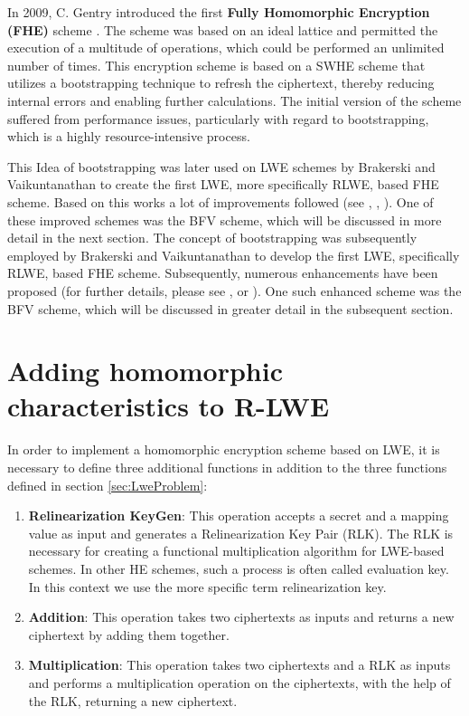 In 2009, C. Gentry introduced the first  \textbf{Fully Homomorphic Encryption (FHE)} scheme \cite{Gentry2009AFH}. The scheme was based on an ideal lattice and permitted the execution of a multitude of operations, which could be performed an unlimited number of times. This encryption scheme is based on a SWHE scheme that utilizes a bootstrapping technique to refresh the ciphertext, thereby reducing internal errors and enabling further calculations. The initial version of the scheme suffered from performance issues, particularly with regard to bootstrapping, which is a highly resource-intensive process.

This Idea of bootstrapping was later used on LWE schemes by Brakerski and Vaikuntanathan \cite{FirstLweFHE} to create the first LWE, more specifically RLWE, based FHE scheme. Based on this works a lot of improvements followed (see \cite{SurveyOfHomomorphicEncryption}, \cite{FheImplementations}, \cite{FHESurvey}). One of these improved schemes was the BFV \cite{bfv} scheme, which will be discussed in more detail in the next section. The concept of bootstrapping was subsequently employed by Brakerski and Vaikuntanathan \cite{FirstLweFHE} to develop the first LWE, specifically RLWE, based FHE scheme. Subsequently, numerous enhancements have been proposed (for further details, please see \cite{SurveyOfHomomorphicEncryption}, \cite{FheImplementations} or \cite{FHESurvey}). One such enhanced scheme was the BFV scheme, which will be discussed in greater detail in the subsequent section.


\section{Adding homomorphic characteristics to R-LWE}

In order to implement a homomorphic encryption scheme based on LWE, it is necessary to define three additional functions in addition to the three functions defined in section \ref{sec:LweProblem}:

\begin{enumerate}
  \item \textbf{Relinearization KeyGen}: This operation accepts a secret and a mapping value as input and generates a Relinearization Key Pair (RLK). The RLK is necessary for creating a functional multiplication algorithm for LWE-based schemes. In other HE schemes, such a process is often called evaluation key. In this context we use the more specific term relinearization key.
  \item \textbf{Addition}: This operation takes two ciphertexts as inputs and returns a new ciphertext by adding them together.
  \item \textbf{Multiplication}: This operation takes two ciphertexts and a RLK as inputs and performs a multiplication operation on the ciphertexts, with the help of the RLK, returning a new ciphertext.
\end{enumerate}

